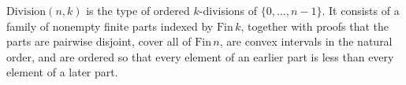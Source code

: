 \(\mathrm{Division}(n,k)\) is the type of ordered \(k\)-divisions of
\(\{0,\ldots,n-1\}\).  It consists of a family of nonempty finite parts indexed
by \(\mathrm{Fin}\,k\), together with proofs that the parts are pairwise
disjoint, cover all of \(\mathrm{Fin}\,n\), are convex intervals in the natural
order, and are ordered so that every element of an earlier part is less than
every element of a later part.
